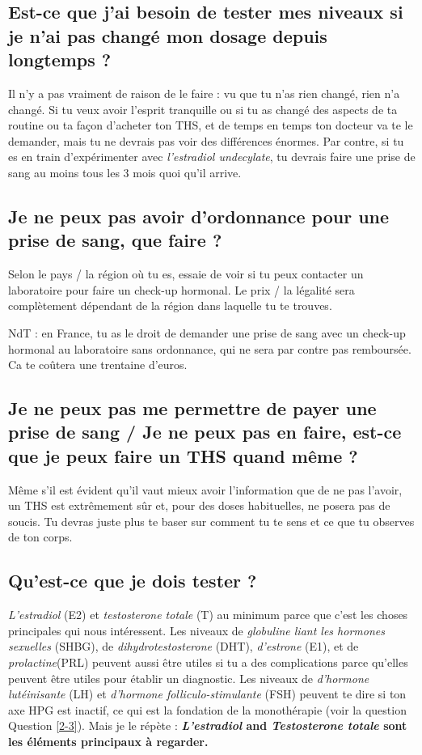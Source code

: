 \documentclass{article}
\begin{document}
\subsection{Est-ce que j'ai besoin de tester mes niveaux si je n'ai pas changé mon dosage depuis longtemps ?}

Il n'y a pas vraiment de raison de le faire : vu que tu n'as rien changé, rien n'a changé. Si tu veux avoir l'esprit tranquille ou si tu as changé des aspects de ta routine ou ta façon d'acheter ton THS, et de temps en temps ton docteur va te le demander, mais tu ne devrais pas voir des différences énormes. Par contre, si tu es en train d'expérimenter avec \textit{l'estradiol undecylate}, tu devrais faire une prise de sang au moins tous les 3 mois quoi qu'il arrive. 

\subsection{Je ne peux pas avoir d'ordonnance pour une prise de sang, que faire ?}


Selon le pays / la région où tu es, essaie de voir si tu peux contacter un laboratoire pour faire un check-up hormonal. Le prix / la légalité sera complètement dépendant de la région dans laquelle tu te trouves. 

NdT : en France, tu as le droit de demander une prise de sang avec un check-up hormonal au laboratoire sans ordonnance, qui ne sera par contre pas remboursée. Ca te coûtera une trentaine d'euros.

\subsection{Je ne peux pas me permettre de payer une prise de sang / Je ne peux pas en faire, est-ce que je peux faire un THS quand même ?}

Même s'il est évident qu'il vaut mieux avoir l'information que de ne pas l'avoir, un THS est extrêmement sûr et, pour des doses habituelles, ne posera pas de soucis. Tu devras juste plus te baser sur comment tu te sens et ce que tu observes de ton corps.

\subsection{Qu'est-ce que je dois tester ?}

\textit{L'estradiol} (E2) et \textit{testosterone totale} (T) au minimum parce que c'est les choses principales qui nous intéressent. Les niveaux de \textit{globuline liant les hormones sexuelles} (SHBG), de \textit{dihydrotestosterone} (DHT), \textit{d'estrone} (E1), et de \textit{prolactine}(PRL) peuvent aussi être utiles si tu a des complications parce qu'elles peuvent être utiles pour établir un diagnostic. Les niveaux de \textit{d'hormone lutéinisante} (LH) et \textit{d'hormone folliculo-stimulante} (FSH) peuvent te dire si ton axe HPG est inactif, ce qui est la fondation de la monothérapie (voir la question Question \ref{2-3}). Mais je le répète : \textbf{\textit{L'estradiol} and \textit{Testosterone totale} sont les éléments principaux à regarder.} 
\end{document}
